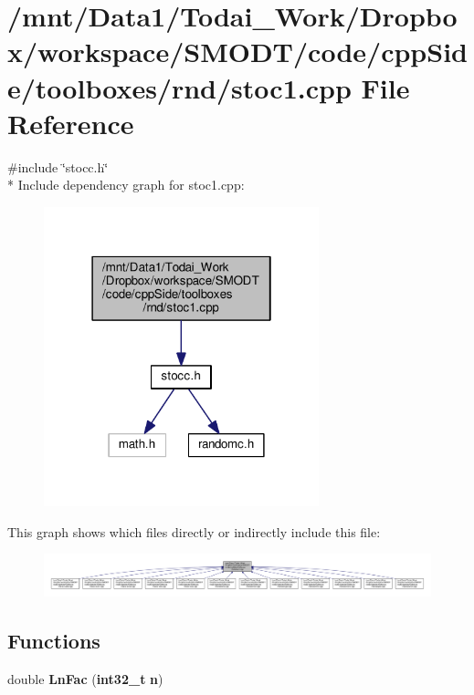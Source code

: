 \section{/mnt/\-Data1/\-Todai\-\_\-\-Work/\-Dropbox/workspace/\-S\-M\-O\-D\-T/code/cpp\-Side/toolboxes/rnd/stoc1.cpp File Reference}
\label{toolboxes_2rnd_2stoc1_8cpp}
{\ttfamily \#include \char`\"{}stocc.\-h\char`\"{}}\\*
Include dependency graph for stoc1.\-cpp\-:\nopagebreak
\begin{figure}[H]
\begin{center}
\leavevmode
\includegraphics[width=226pt]{toolboxes_2rnd_2stoc1_8cpp__incl}
\end{center}
\end{figure}
This graph shows which files directly or indirectly include this file\-:\nopagebreak
\begin{figure}[H]
\begin{center}
\leavevmode
\includegraphics[width=350pt]{toolboxes_2rnd_2stoc1_8cpp__dep__incl}
\end{center}
\end{figure}
\subsection*{Functions}
\begin{DoxyCompactItemize}
\item 
double {\bf Ln\-Fac} ({\bf int32\-\_\-t} {\bf n})
\end{DoxyCompactItemize}
